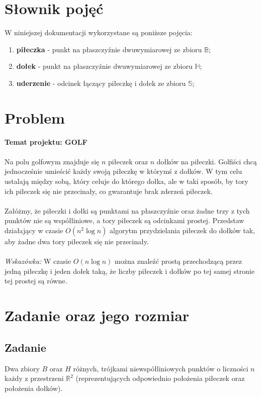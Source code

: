 \documentclass[10pt,a4paper]{article}
\begin{document}
	\newpage
	
	\section{Słownik pojęć}
	
	W niniejszej dokumentacji wykorzystane są poniższe pojęcia:
	\begin{enumerate}
		\item \textbf{piłeczka} - punkt na płaszczyźnie dwuwymiarowej ze zbioru $\mathbb{B}$;
		\item \textbf{dołek} - punkt na płaszczyźnie dwuwymiarowej ze zbioru $\mathbb{H}$;
		\item \textbf{uderzenie} - odcinek łączący piłeczkę i dołek ze zbioru $\mathbb{S}$;
	\end{enumerate}
	
	\section{Problem}
	
	\textbf{Temat projektu: GOLF} \\~\\
	Na polu golfowym znajduje się $n$ piłeczek oraz $n$ dołków na piłeczki. Golfiści chcą jednocześnie umieścić każdy swoją piłeczkę w którymś z dołków. W tym celu ustalają między sobą, który celuje do którego dołka, ale w taki sposób, by tory ich	piłeczek się nie przecinały, co gwarantuje brak zderzeń piłeczek.\\~\\ 
	Załóżmy, że piłeczki i dołki są punktami na płaszczyźnie oraz żadne trzy z tych punktów nie są współliniowe, a tory piłeczek są odcinkami prostej. Przedstaw działający w czasie $O(n^2\log n)$ algorytm przydzielania piłeczek do dołków tak, aby żadne dwa tory piłeczek się nie przecinały.\\~\\
	\textit{Wskazówka:} W czasie $O(n\log n)$ można znaleźć prostą przechodzącą przez jedną piłeczkę i jeden dołek taką, że liczby piłeczek i dołków po tej samej stronie tej prostej są równe.
	
	\section{Zadanie oraz jego rozmiar}
	
	\subsection{Zadanie}
	Dwa zbiory $B$ oraz $H$ różnych, trójkami niewspółliniowych punktów o liczności $n$ każdy z przestrzeni $\mathbb{R}^{2}$ (reprezentujących odpowiednio położenia piłeczek oraz położenia dołków).
	
\end{document}
